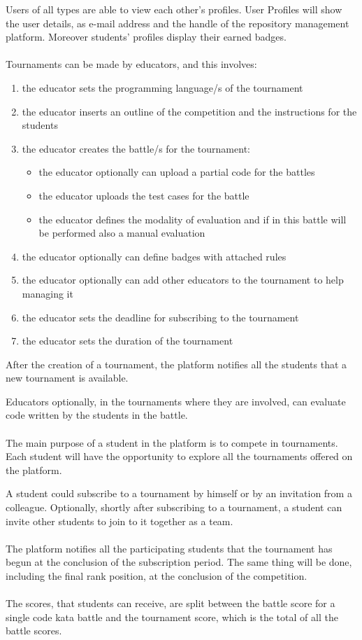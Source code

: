Users of all types are able to view each other's profiles. User Profiles will show the user details, as e-mail address and the handle of the repository management platform. Moreover students' profiles display their earned badges.\\
\\
Tournaments can be made by educators, and this involves:
\begin{enumerate}[label=$\bullet$]
    \item the educator sets the programming language/s of the tournament
    \item the educator inserts an outline of the competition and the instructions for the students
    \item the educator creates the battle/s for the tournament:
    \begin{itemize}
        \item the educator optionally can upload a partial code for the battles
        \item the educator uploads the test cases for the battle
        \item the educator defines the modality of evaluation and if in this battle will be performed also a manual evaluation
    \end{itemize}
    \item the educator optionally can define badges with attached rules
    \item the educator optionally can add other educators to the tournament to help managing it
    \item the educator sets the deadline for subscribing to the tournament
    \item the educator sets the duration of the tournament
\end{enumerate}
After the creation of a tournament, the platform notifies all the students that a new tournament is available.

Educators optionally, in the tournaments where they are involved, can evaluate code written by the students in the battle.\\
\\
The main purpose of a student in the platform is to compete in tournaments.\\
Each student will have the opportunity to explore all the tournaments offered on the platform.

A student could subscribe to a tournament by himself or by an invitation from a colleague. Optionally, shortly after subscribing to a tournament, a student can invite other students to join to it together as a team.\\
\\
The platform notifies all the participating students that the tournament has begun at the conclusion of the subscription period. The same thing will be done, including the final rank position, at the conclusion of the competition.\\
\\
The scores, that students can receive, are split between the battle score for a single code kata battle and the tournament score, which is the total of all the battle scores.

